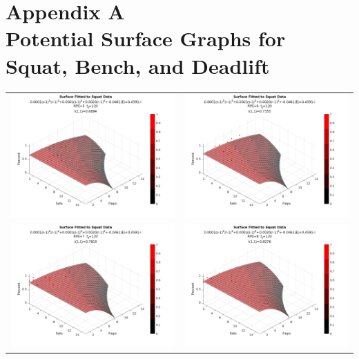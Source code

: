 \appendix

\section{
    Appendix A
    \\
    \large{Potential Surface Graphs for Squat, Bench, and Deadlift}
}
\label{sec:AppendixA}

\begin{table}[h]
    \centering
    \begin{tabular}{c|c}
        \includegraphics[width=78mm]{SquatSurface/5.png} &  
        \includegraphics[width=78mm]{SquatSurface/6.png} \\
         
        \includegraphics[width=78mm]{SquatSurface/7.png} &
        \includegraphics[width=78mm]{SquatSurface/8.png} \\
        

\end{tabular}
\end{table}

